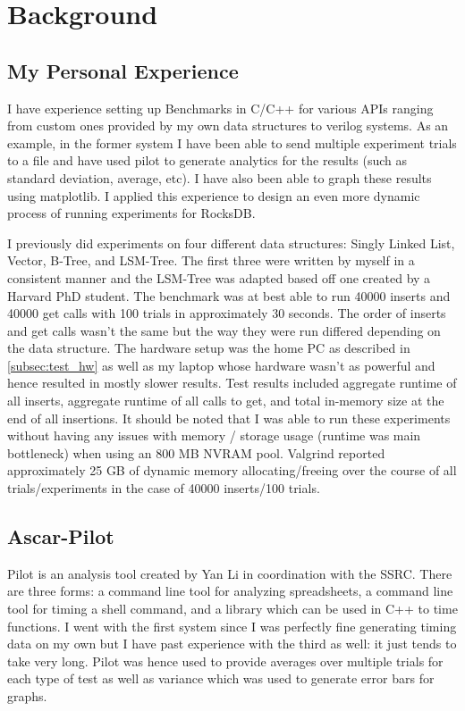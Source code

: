 \documentclass[twocolumn,11pt]{article}
\begin{document}
\section{Background}
\label{sec:background}

\subsection{My Personal Experience}
\label{subsec:personal_experience}

I have experience setting up Benchmarks in C/C++ for various APIs ranging from
custom ones provided by my own data structures to verilog systems.
As an example, in the former system I have been able to send multiple experiment
trials to a file and have used pilot to generate analytics for the results (such
as standard deviation, average, etc). I have also been able to graph these
results using matplotlib. I applied this experience to design an even more
dynamic process of running experiments for RocksDB.

I previously did experiments on four different data structures: Singly Linked
List, Vector, B-Tree, and LSM-Tree. The first three were written by myself in a
consistent manner and the LSM-Tree was adapted based off one created by a
Harvard PhD student. The benchmark was at best able to run 40000 inserts and
40000 get calls with 100 trials in approximately 30 seconds. The order of
inserts and get calls wasn't the same but the way they were run differed
depending on the data structure. The hardware setup was the home PC as described
in \ref{subsec:test_hw} as well as my laptop whose hardware wasn't as powerful
and hence resulted in mostly slower results. Test results included aggregate
runtime of all inserts, aggregate runtime of all calls to get, and total
in-memory size at the end of all insertions. It should be noted that I was able
to run these experiments without having any issues with memory / storage usage
(runtime was main bottleneck) when using an 800 MB NVRAM pool. Valgrind reported
approximately 25 GB of dynamic memory allocating/freeing over the course of all
trials/experiments in the case of 40000 inserts/100 trials.

\subsection{Ascar-Pilot}

Pilot\cite{li:pilot} is an analysis tool created by Yan Li in coordination with
the SSRC. There are three forms: a command line tool for analyzing spreadsheets,
a command line tool for timing a shell command, and a library which can be used
in C++ to time functions. I went with the first system since I was perfectly
fine generating timing data on my own but I have past experience with the third
as well: it just tends to take very long. Pilot was hence used to provide
averages over multiple trials for each type of test as well as variance which
was used to generate error bars for graphs.
\end{document}
